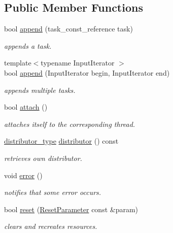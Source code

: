 \subsection*{Public Member Functions}
\begin{DoxyCompactItemize}
\item 
bool \hyperlink{group__task_gaef74f2d2dd44b8e13f615963ea1e1f0f}{append} (task\-\_\-const\-\_\-reference task)
\begin{DoxyCompactList}\small\item\em appends a task. \end{DoxyCompactList}\item 
{\footnotesize template$<$typename Input\-Iterator $>$ }\\bool \hyperlink{group__task_gabb7f26f7fde9cb631988f9cf906d499f}{append} (Input\-Iterator begin, Input\-Iterator end)
\begin{DoxyCompactList}\small\item\em appends multiple tasks. \end{DoxyCompactList}\item 
bool \hyperlink{classhryky_1_1task_1_1worker_1_1_base_ae17d5723d8aa5567ea6a47b67f8133c4}{attach} ()
\begin{DoxyCompactList}\small\item\em attaches itself to the corresponding thread. \end{DoxyCompactList}\item 
\hyperlink{classhryky_1_1task_1_1distributor_1_1_batch}{distributor\-\_\-type} \hyperlink{classhryky_1_1task_1_1worker_1_1_batch_ae524443d01bdfe8db31bd6f01a983388}{distributor} () const 
\begin{DoxyCompactList}\small\item\em retrieves own distributor. \end{DoxyCompactList}\item 
\hypertarget{classhryky_1_1task_1_1worker_1_1_base_aa39b31ced492faec5dd3b6478b0a98df}{void \hyperlink{classhryky_1_1task_1_1worker_1_1_base_aa39b31ced492faec5dd3b6478b0a98df}{error} ()}\label{classhryky_1_1task_1_1worker_1_1_base_aa39b31ced492faec5dd3b6478b0a98df}

\begin{DoxyCompactList}\small\item\em notifies that some error occurs. \end{DoxyCompactList}\item 
bool \hyperlink{group__task_ga88b1f6b27be23acb9fd42203d7cd3933}{reset} (\hyperlink{structhryky_1_1task_1_1worker_1_1_base_1_1_reset_parameter}{Reset\-Parameter} const \&param)
\begin{DoxyCompactList}\small\item\em clears and recreates resources. \end{DoxyCompactList}\end{DoxyCompactItemize}
